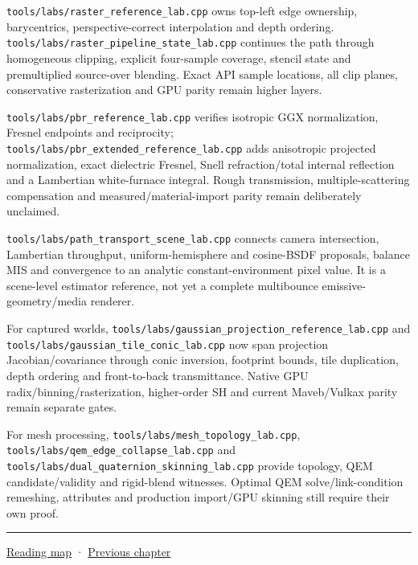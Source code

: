 \texttt{tools/labs/raster\_reference\_lab.cpp} owns top-left edge ownership, barycentrics, perspective-correct interpolation and depth ordering. \texttt{tools/labs/raster\_pipeline\_state\_lab.cpp} continues the path through homogeneous clipping, explicit four-sample coverage, stencil state and premultiplied source-over blending. Exact API sample locations, all clip planes, conservative rasterization and GPU parity remain higher layers.

\texttt{tools/labs/pbr\_reference\_lab.cpp} verifies isotropic GGX normalization, Fresnel endpoints and reciprocity; \texttt{tools/labs/pbr\_extended\_reference\_lab.cpp} adds anisotropic projected normalization, exact dielectric Fresnel, Snell refraction/total internal reflection and a Lambertian white-furnace integral. Rough transmission, multiple-scattering compensation and measured/material-import parity remain deliberately unclaimed.

\texttt{tools/labs/path\_transport\_scene\_lab.cpp} connects camera intersection, Lambertian throughput, uniform-hemisphere and cosine-BSDF proposals, balance MIS and convergence to an analytic constant-environment pixel value. It is a scene-level estimator reference, not yet a complete multibounce emissive-geometry/media renderer.

For captured worlds, \texttt{tools/labs/gaussian\_projection\_reference\_lab.cpp} and \texttt{tools/labs/gaussian\_tile\_conic\_lab.cpp} now span projection Jacobian/covariance through conic inversion, footprint bounds, tile duplication, depth ordering and front-to-back transmittance. Native GPU radix/binning/rasterization, higher-order SH and current Maveb/Vulkax parity remain separate gates.

For mesh processing, \texttt{tools/labs/mesh\_topology\_lab.cpp}, \texttt{tools/labs/qem\_edge\_collapse\_lab.cpp} and \texttt{tools/labs/dual\_quaternion\_skinning\_lab.cpp} provide topology, QEM candidate/validity and rigid-blend witnesses. Optimal QEM solve/link-condition remeshing, attributes and production import/GPU skinning still require their own proof.

\begin{center}\rule{0.5\linewidth}{0.5pt}\end{center}

\hyperref[volume-reading-map]{Reading map} · \hyperref[04-visual-computing-ii-ch042-xr-radiometry-optics-and-perception]{Previous chapter}
